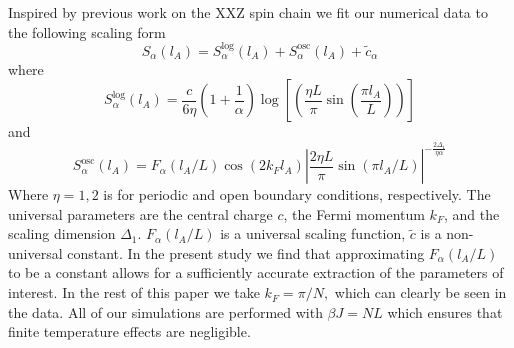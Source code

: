 \documentclass[aps,prb,reprint,floatfix]{revtex4-1}
\begin{document}
Inspired by previous work on the XXZ spin chain we fit our numerical data to the following scaling form\cite{Calabrese2010:ParityEffects}
{\allowdisplaybreaks
\begin{equation}
		S_{\alpha}(l_{A}) =S^{\mathrm{log}}_{\alpha}(l_{A})+S^{\mathrm{osc}}_{\alpha}(l_{A})+\tilde{c}_\alpha
\label{eq:GenScalingForm}
\end{equation}}
where
{\allowdisplaybreaks
\begin{equation}
		S^{\mathrm{log}}_{\alpha}(l_{A}) =\frac{c}{6 \eta}\left(1+\frac{1}{\alpha}\right)\log\left[\left(\frac{\eta L}{\pi}\sin\left(\frac{\pi l_{A}}{L}\right)\right)\right]
\label{eq:Slog}
\end{equation}}
and 
{\allowdisplaybreaks
\begin{equation}
		S^{\mathrm{osc}}_{\alpha}(l_{A}) =F_{\alpha}(l_{A}/L)\cos(2k_Fl_{A})\left|\frac{2\eta L}{\pi}\sin(\pi l_{A}/L)\right|^{-\frac{2\Delta_{1}}{\eta \alpha}}
\label{eq:Sosc}
\end{equation}}
Where $\eta=1,2$ is for periodic and open boundary conditions, respectively.  The universal parameters are the central charge $c$, the Fermi momentum $k_{F}$, and the scaling dimension $\Delta_{1}$.  $F_{\alpha}(l_{A}/L)$ is a universal scaling function, $\tilde{c}$ is a non-universal constant.  In the present study we find that approximating $F_{\alpha}(l_{A}/L)$ to be a constant allows for a sufficiently accurate extraction of the parameters of interest.  In the rest of this paper we take $k_{F}=\pi/N,$ which can clearly be seen in the data.  All of our simulations are performed with $\beta J=N L$ which ensures that finite temperature effects are negligible.
\end{document}
